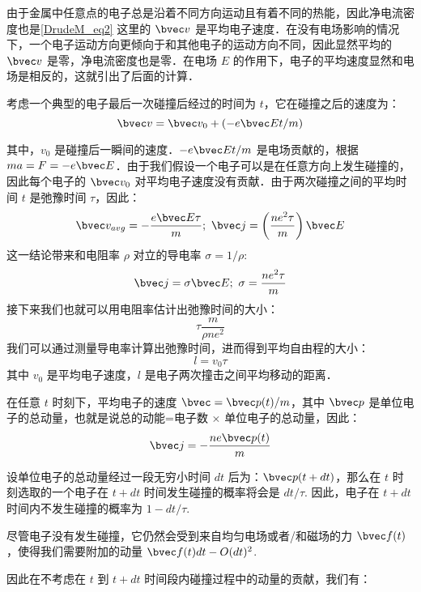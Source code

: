 由于金属中任意点的电子总是沿着不同方向运动且有着不同的热能，因此净电流密度也是\autoref{DrudeM_eq2} 这里的 $\bvec v$ 是平均电子速度．在没有电场影响的情况下，一个电子运动方向更倾向于和其他电子的运动方向不同，因此显然平均的 $\bvec v$ 是零，净电流密度也是零．在电场 $E$ 的作用下，电子的平均速度显然和电场是相反的，这就引出了后面的计算．

考虑一个典型的电子最后一次碰撞后经过的时间为 $t$，它在碰撞之后的速度为：
\begin{equation}
\bvec v = \bvec v_0 + (-e\bvec E t/m)
\end{equation}

其中，$v_0$ 是碰撞后一瞬间的速度．$-e\bvec E t/m$ 是电场贡献的，根据 $ma = F = -e\bvec E$．由于我们假设一个电子可以是在任意方向上发生碰撞的，因此每个电子的 $\bvec v_0$ 对平均电子速度没有贡献．由于两次碰撞之间的平均时间 $t$ 是弛豫时间 $\tau$，因此：
\begin{equation}
\bvec v_{avg} = -\frac{e\bvec E \tau}{m}; \ \bvec j =\left(\frac{ne^2\tau}{m}\right)\bvec E
\end{equation}
这一结论带来和电阻率 $\rho$ 对立的导电率 $\sigma = 1/\rho$:
\begin{equation}\label{DrudeM_eq4}
\bvec j = \sigma \bvec E; \ \sigma = \frac{ne^2\tau}{m}
\end{equation}
接下来我们也就可以用电阻率估计出弛豫时间的大小：
\begin{equation}
\tau \frac{m}{\rho n e^2}
\end{equation}
我们可以通过测量导电率计算出弛豫时间，进而得到平均自由程的大小：
\begin{equation}
l=v_0\tau
\end{equation}
其中 $v_0$ 是平均电子速度，$l$ 是电子两次撞击之间平均移动的距离．

在任意 $t$ 时刻下，平均电子的速度 $\bvec=\bvec p(t)/m$，其中 $\bvec p$ 是单位电子的总动量，也就是说总的动能=电子数 $\times$ 单位电子的总动量，因此：
\begin{equation}
\bvec j= -\frac{ne\bvec p(t)}{m}
\end{equation}

设单位电子的总动量经过一段无穷小时间 $dt$ 后为：$\bvec p (t+dt)$，那么在 $t$ 时刻选取的一个电子在 $t+dt$ 时间发生碰撞的概率将会是 $dt/\tau$. 因此，电子在 $t+dt$ 时间内不发生碰撞的概率为 $1-dt/\tau$.

尽管电子没有发生碰撞，它仍然会受到来自均匀电场或者/和磁场的力 $\bvec f(t)$，使得我们需要附加的动量 $\bvec f(t)dt - O(dt)^2$.

因此在不考虑在 $t$ 到 $t+dt$ 时间段内碰撞过程中的动量的贡献，我们有：


